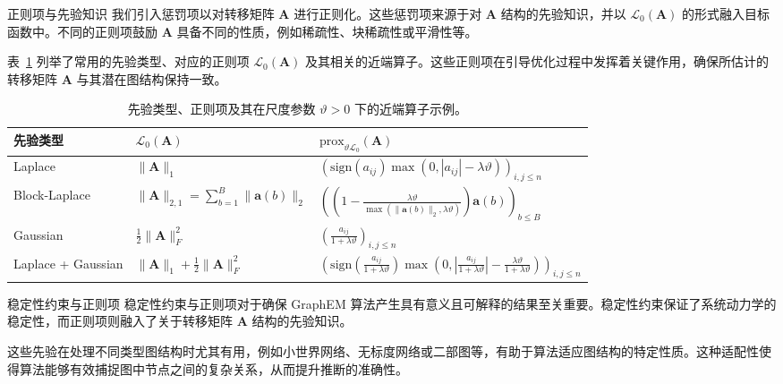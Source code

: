 \documentclass[presentation,aspectratio=169]{ctexbeamer}
\begin{document}
\begin{frame}{正则项与先验知识}
我们引入惩罚项以对转移矩阵 \(\mathbf{A}\) 进行正则化。这些惩罚项来源于对 \(\mathbf{A}\) 结构的先验知识，并以 \(\mathcal{L}_0(\mathbf{A})\) 的形式融入目标函数中。不同的正则项鼓励 \(\mathbf{A}\) 具备不同的性质，例如稀疏性、块稀疏性或平滑性等。\par
\vspace{8pt}
\pause

表~\ref{tab: reg prox table} 列举了常用的先验类型、对应的正则项 \(\mathcal{L}_0(\mathbf{A})\) 及其相关的近端算子。这些正则项在引导优化过程中发挥着关键作用，确保所估计的转移矩阵 \(\mathbf{A}\) 与其潜在图结构保持一致。
\end{frame}

\begin{frame}
\begin{table}[tb]
    \centering
    \caption{先验类型、正则项及其在尺度参数 \(\vartheta > 0\) 下的近端算子示例。}
    \label{tab: reg prox table}
    \begin{tabular}{@{}p{1.8cm}p{4.1cm}p{8cm}@{}}
        \toprule
        \textbf{先验类型} & \textbf{\(\mathcal{L}_0(\mathbf{A})\)} & \textbf{\(\text{prox}_{\vartheta \mathcal{L}_0}(\mathbf{A})\)} \\ 
        \midrule
        Laplace & \(\|\mathbf{A}\|_1\) & \(\left(\text{sign}(a_{ij}) \max(0, |a_{ij}| - \lambda\vartheta)\right)_{i, j \le n}\) \\ 
        \addlinespace
        Block-Laplace & \(\|\mathbf{A}\|_{2, 1} = \sum_{b=1}^B \|\mathbf{a}(b)\|_2\) & \(\left(\left(1 - \frac{\lambda\vartheta}{\max(\|\mathbf{a}(b)\|_2, \lambda\vartheta)}\right)\mathbf{a}(b)\right)_{b \le B}\) \\ 
        \addlinespace
        Gaussian & \(\frac{1}{2} \|\mathbf{A}\|_F^2\) & \(\left(\frac{a_{ij}}{1+\lambda\vartheta}\right)_{i, j \le n}\) \\ 
        \addlinespace
        Laplace + Gaussian & \(\|\mathbf{A}\|_1 + \frac{1}{2} \|\mathbf{A}\|_F^2\) & \(\left(\text{sign}\left(\frac{a_{ij}}{1+\lambda\vartheta}\right) \max\left(0, |\frac{a_{ij}}{1+\lambda\vartheta}| - \frac{\lambda\vartheta}{1+\lambda\vartheta}\right)\right)_{i, j \le n}\) \\ 
        \bottomrule
    \end{tabular}
\end{table}
\end{frame}

\begin{frame}{稳定性约束与正则项}
稳定性约束与正则项对于确保 GraphEM 算法产生具有意义且可解释的结果至关重要。稳定性约束保证了系统动力学的稳定性，而正则项则融入了关于转移矩阵 \(\mathbf{A}\) 结构的先验知识。
\vspace{8pt}
\pause

这些先验在处理不同类型图结构时尤其有用，例如小世界网络、无标度网络或二部图等，有助于算法适应图结构的特定性质。这种适配性使得算法能够有效捕捉图中节点之间的复杂关系，从而提升推断的准确性。
\end{frame}
\end{document}
